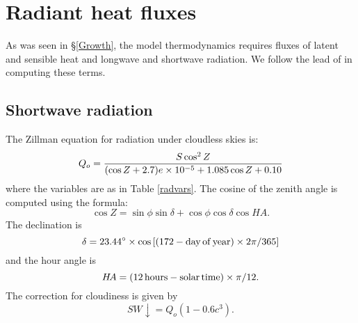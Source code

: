 \section{Radiant heat fluxes}
\label{shortwave}

As was seen in \S\ref{Growth}, the model thermodynamics requires
fluxes of latent and sensible heat and longwave and shortwave
radiation.  We follow the lead of
\cite{Parkinson} in computing these terms.

\subsection{Shortwave radiation}

The Zillman equation for radiation under cloudless skies is:
\begin{equation}
   Q_o = {S \cos^2 Z \over (\cos Z + 2.7) e \times 10^{-5} + 1.085
   \cos Z + 0.10}
\end{equation}
where the variables are as in Table \ref{radvars}.  The cosine of the
zenith angle is computed using the formula:
\begin{equation}
   \cos Z = \sin \phi \sin \delta + \cos \phi \cos \delta \cos H\!A .
\end{equation}
The declination is 
\begin{equation}
   \delta = 23.44^{\circ} \times \cos \left[ (172 - {\rm day \, of \, year})
   \times 2 \pi / 365 \right]
\end{equation}
and the hour angle is
\begin{equation}
   H\!A = (12 \, {\rm hours - solar \, time}) \times \pi / 12 .
\end{equation}
The correction for cloudiness is given by
\begin{equation}
   SW\!\!\downarrow = Q_o ( 1 - 0.6 c^3) .
\end{equation}

